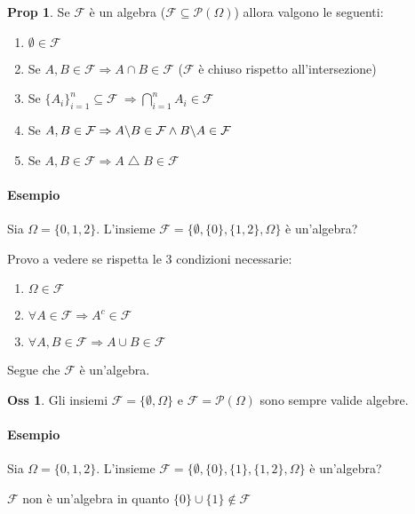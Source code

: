 \documentclass[12pt, a4paper]{report}
\theoremstyle{definition}
\newtheorem*{proposition}{Prop}
\newtheorem*{observation}{Oss}
\DeclareRobustCommand{\F}{\mathcal{F}}%
\DeclareRobustCommand{\powerset}{\mathcal{P}(\Omega)}
\DeclareRobustCommand{\tribedef}{\F\subseteq \powerset}
\begin{document}
\begin{proposition}
	Se $\F$ è un algebra ($\tribedef$) allora valgono le seguenti:
	\begin{enumerate}[label=(\roman*)]
		\item \(\emptyset\in\F\)
		\item Se \(A,B\in\F\Rightarrow A\cap B\in\F\)
		($\F$ è chiuso rispetto all'intersezione)
		\item Se \(\{A_i\}_{i=1}^n\subseteq\F\ \Rightarrow
		\bigcap_{i=1}^n A_i\in\F\)
		\item Se \(A,B\in\F\Rightarrow A\symbol{92}B\in\F\wedge
		B\symbol{92}A\in\F\)
		\item Se \(A,B\in\F\Rightarrow A\bigtriangleup B\in\F\)
	\end{enumerate}
\end{proposition}

\paragraph*{Esempio}
Sia $\Omega=\{0,1,2\}$. L'insieme \(\F=\{\emptyset, \{0\}, \{1,2\}, \Omega\}\) è
un'algebra?

Provo a vedere se rispetta le 3 condizioni necessarie:
\begin{enumerate}[label=(\roman*)]
	\item \(\Omega\in\F\) \checkmark
	\item \(\forall A\in\F \Rightarrow A^c\in\F\) \checkmark
	\item \(\forall A,B\in\F \Rightarrow A\cup B\in\F\) \checkmark
\end{enumerate}
\noindent
Segue che $\F$ è un'algebra.
\begin{observation}
	Gli insiemi \(\F=\{\emptyset, \Omega\}\) e \(\F=\powerset\) sono sempre
	valide algebre.
\end{observation}

\paragraph*{Esempio}
Sia $\Omega=\{0,1,2\}$. L'insieme \(\F=\{\emptyset, \{0\}, \{1\}, \{1,2\},
\Omega\}\) è un'algebra?

$\F$ non è un'algebra in quanto \(\{0\}\cup\{1\}\notin\F\)
\end{document}
